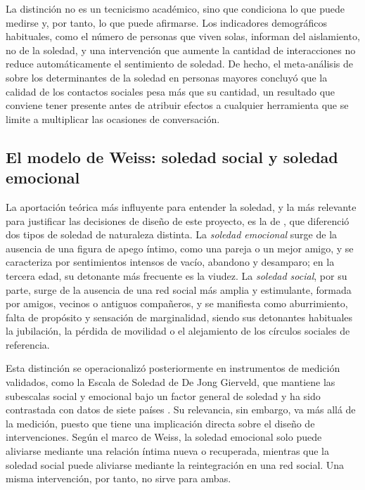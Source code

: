 La distinción no es un tecnicismo académico, sino que condiciona lo que puede medirse y, por tanto, lo que puede afirmarse. Los indicadores demográficos habituales, como el número de personas que viven solas, informan del aislamiento, no de la soledad, y una intervención que aumente la cantidad de interacciones no reduce automáticamente el sentimiento de soledad. De hecho, el meta-análisis de \textcite{Pinquart2001} sobre los determinantes de la soledad en personas mayores concluyó que la calidad de los contactos sociales pesa más que su cantidad, un resultado que conviene tener presente antes de atribuir efectos a cualquier herramienta que se limite a multiplicar las ocasiones de conversación.

\subsection{El modelo de Weiss: soledad social y soledad emocional}

La aportación teórica más influyente para entender la soledad, y la más relevante para justificar las decisiones de diseño de este proyecto, es la de \textcite{Weiss1973}, que diferenció dos tipos de soledad de naturaleza distinta. La \textit{soledad emocional} surge de la ausencia de una figura de apego íntimo, como una pareja o un mejor amigo, y se caracteriza por sentimientos intensos de vacío, abandono y desamparo; en la tercera edad, su detonante más frecuente es la viudez. La \textit{soledad social}, por su parte, surge de la ausencia de una red social más amplia y estimulante, formada por amigos, vecinos o antiguos compañeros, y se manifiesta como aburrimiento, falta de propósito y sensación de marginalidad, siendo sus detonantes habituales la jubilación, la pérdida de movilidad o el alejamiento de los círculos sociales de referencia.

Esta distinción se operacionalizó posteriormente en instrumentos de medición validados, como la Escala de Soledad de De Jong Gierveld, que mantiene las subescalas social y emocional bajo un factor general de soledad y ha sido contrastada con datos de siete países \citep{DeJongGierveld2010}. Su relevancia, sin embargo, va más allá de la medición, puesto que tiene una implicación directa sobre el diseño de intervenciones. Según el marco de Weiss, la soledad emocional solo puede aliviarse mediante una relación íntima nueva o recuperada, mientras que la soledad social puede aliviarse mediante la reintegración en una red social. Una misma intervención, por tanto, no sirve para ambas.

